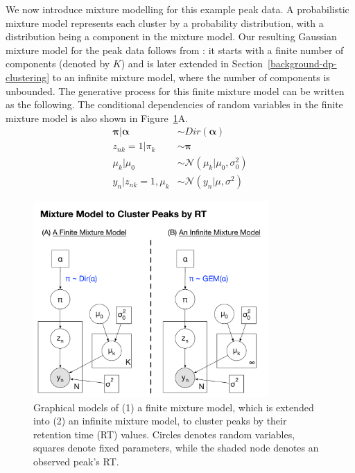We now introduce mixture modelling for this example peak data. A probabilistic mixture model represents each cluster by a probability distribution, with a distribution being a component in the mixture model. Our resulting Gaussian mixture model for the peak data follows from \cite{Rasmussen2000}: it starts with a finite number of components (denoted by $K$) and is later extended in Section~\ref{background-dp-clustering} to an infinite mixture model, where the number of components is unbounded. The generative process for this finite mixture model can be written as the following. The conditional dependencies of random variables in the finite mixture model is also shown in Figure~\ref{fig:background-mixture-plate-diagram}A. 
\begin{equation}
\begin{aligned}
\boldsymbol{\pi} \vert \boldsymbol{\alpha} &\sim Dir(\boldsymbol{\alpha}) \\
z_{nk}=1 \vert \pi_k                                  &\sim \boldsymbol{\pi} \\
\mu_k \vert \mu_0                                    &\sim \mathcal{N}(\mu_k \vert \mu_0, \sigma_0^2) \\
y_n \vert z_{nk}=1, \mu_k                         &\sim \mathcal{N}(y_n \vert \mu, \sigma^2)
\end{aligned}
\label{eq:background-finite-mixture}
\end{equation}

\begin{figure}[tbh!]
\noindent \begin{centering}
\includegraphics[width=0.8\textwidth]{03-machine-learning/figures/mixture_model.pdf}
\par\end{centering}
\caption[Graphical models of (1) a finite mixture model, which is extended into (2) an infinite mixture model, to cluster peaks by their retention time (RT) values.]{\label{fig:background-mixture-plate-diagram}Graphical models of (1) a finite mixture model, which is extended into (2) an infinite mixture model, to cluster peaks by their retention time (RT) values. Circles denotes random variables, squares denote fixed parameters, while the shaded node denotes an observed peak's RT.}
\end{figure}

